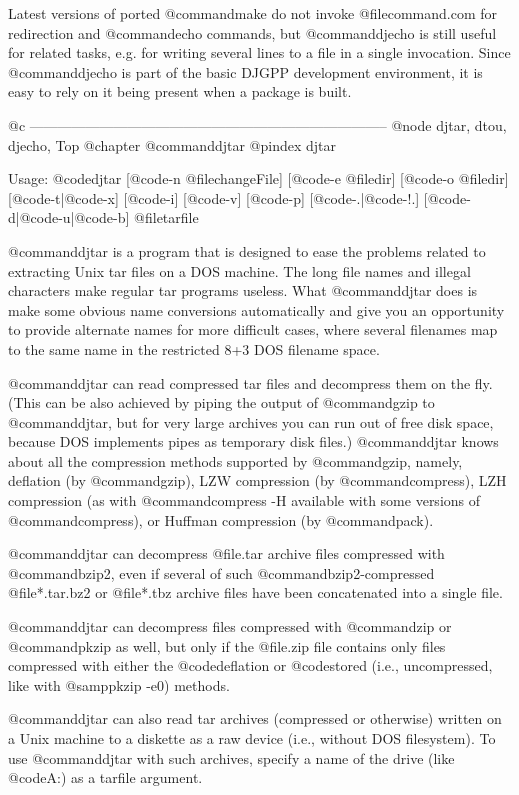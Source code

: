 Latest versions of ported @command{make} do not invoke @file{command.com}
for redirection and @command{echo} commands, but @command{djecho} is still
useful for related tasks, e.g. for writing several lines to a file in a
single invocation.  Since @command{djecho} is part of the basic DJGPP
development environment, it is easy to rely on it being present when a
package is built.

@c -----------------------------------------------------------------------------
@node djtar, dtou, djecho, Top
@chapter @command{djtar}
@pindex djtar

Usage: @code{djtar} [@code{-n} @file{changeFile}] [@code{-e} @file{dir}]
[@code{-o} @file{dir}] [@code{-t}|@code{-x}] [@code{-i}] [@code{-v}] 
[@code{-p}] [@code{-.}|@code{-!.}] [@code{-d}|@code{-u}|@code{-b}] 
@file{tarfile}

@command{djtar} is a program that is designed to ease the problems related
to extracting Unix tar files on a DOS machine.  The long file names and
illegal characters make regular tar programs useless.  What @command{djtar}
does is make some obvious name conversions automatically and give you an
opportunity to provide alternate names for more difficult cases, where
several filenames map to the same name in the restricted 8+3 DOS filename
space.

@command{djtar} can read compressed tar files and decompress them on the
fly.  (This can be also achieved by piping the output of @command{gzip} to
@command{djtar}, but for very large archives you can run out of free disk
space, because DOS implements pipes as temporary disk files.)
@command{djtar} knows about all the compression methods supported by
@command{gzip}, namely, deflation (by @command{gzip}), LZW compression
(by @command{compress}), LZH compression (as with @command{compress -H}
available with some versions of @command{compress}), or Huffman compression
(by @command{pack}).

@command{djtar} can decompress @file{.tar} archive files compressed with
@command{bzip2}, even if several of such @command{bzip2}-compressed
@file{*.tar.bz2} or @file{*.tbz} archive files have been concatenated
into a single file.

@command{djtar} can decompress files compressed with @command{zip} or
@command{pkzip} as well, but only if the @file{.zip} file contains only
files compressed with either the @code{deflation} or @code{stored}
(i.e., uncompressed, like with @samp{pkzip -e0}) methods.

@command{djtar} can also read tar archives (compressed or otherwise) written
on a Unix machine to a diskette as a raw device (i.e., without DOS
filesystem).  To use @command{djtar} with such archives, specify a name
of the drive (like @code{A:}) as a tarfile argument.

